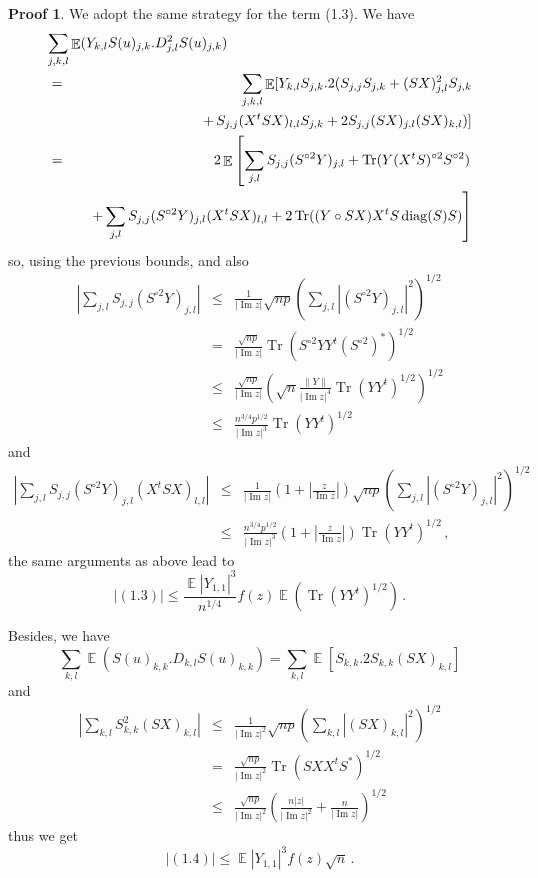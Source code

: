 \documentclass[11pt,a4paper]{article}
\DeclareMathOperator{\E}{\mathbb{E}}
\DeclareMathOperator{\1}{\mathbf{1}}
\DeclareMathOperator{\Imag}{\mathrm{Im}}
\DeclareMathOperator{\Tr}{\mathrm{Tr}}
\DeclareMathOperator{\diag}{\mathrm{diag}}
\theoremstyle{definition}
\newtheorem*{Proof}{Proof}
\begin{document}
\begin{Proof}
We adopt the same strategy for the term (1.3). We have
\begin{eqnarray*}
\lefteqn{   \sum_{j,k,l} \E (Y_{k,l}S(u)_{j,k}.D^2_{j,l}S(u)_{j,k})   } \\
& = & \sum_{j,k,l} \E[ Y_{k,l} S_{j,k} . 2(S_{j,j} S_{j,k} + (SX)_{j,l}^2 S_{j,k}  \\
& & \quad + \, S_{j,j} (X^tSX)_{l,l} S_{j,k} + 2 S_{j,j} (SX)_{j,l} (SX)_{k,l}) ] \\
& = & 2 \E \left[ \sum_{j,l} S_{j,j} (S^{\circ 2}Y)_{j,l} + \Tr( Y(X^tS)^{\circ 2}S^{\circ 2} ) \right. \\
& & \quad \left. + \sum_{j,l} S_{j,j} (S^{\circ 2}Y)_{j,l} (X^tSX)_{l,l} + 2 \Tr( (Y \circ SX)X^tS\diag(S)S ) \right]
\end{eqnarray*}
so, using the previous bounds, and also
\begin{eqnarray*}
\left| \sum_{j,l} S_{j,j} (S^{\circ 2}Y)_{j,l} \right|
& \le & \frac{1}{|\Imag z|} \sqrt{np} \left( \sum_{j,l} |(S^{\circ 2}Y)_{j,l}|^2 \right)^{1/2} \\
& = & \frac{\sqrt{np}}{|\Imag z|} \Tr( S^{\circ 2}YY^t(S^{\circ 2})^* )^{1/2} \\
& \le & \frac{\sqrt{np}}{|\Imag z|} \left( \sqrt{n} \frac{\|Y\|}{|\Imag z|^4} \Tr(YY^t)^{1/2} \right)^{1/2} \\
& \le & \frac{n^{3/4} p^{1/2}}{|\Imag z|^3} \Tr(YY^t)^{1/2}
\end{eqnarray*}
and
\begin{eqnarray*}
\left| \sum_{j,l} S_{j,j} (S^{\circ 2}Y)_{j,l} (X^tSX)_{l,l} \right|
& \le & \frac{1}{|\Imag z|} \left( 1 + \left| \frac{z}{\Imag z} \right| \right) \sqrt{np} \left( \sum_{j,l} |(S^{\circ 2}Y)_{j,l}|^2 \right)^{1/2} \\
& \le & \frac{n^{3/4} p^{1/2}}{|\Imag z|^3} \left( 1 + \left| \frac{z}{\Imag z} \right| \right) \Tr(YY^t)^{1/2} \, ,
\end{eqnarray*}
the same arguments as above lead to
\begin{displaymath}
|(1.3)| \le \frac{\E|Y_{1,1}|^3}{n^{1/4}} f(z) \E (\Tr(YY^t)^{1/2}) \, .
\end{displaymath}

Besides, we have
\begin{displaymath}
\sum_{k,l} \E (S(u)_{k,k}.D_{k,l}S(u)_{k,k}) = \sum_{k,l} \E[ S_{k,k} . 2 S_{k,k} (SX)_{k,l}]
\end{displaymath}
and
\begin{eqnarray*}
\left| \sum_{k,l} S_{k,k}^2 (SX)_{k,l} \right|
& \le & \frac{1}{|\Imag z|^2} \sqrt{np} \left( \sum_{k,l} |(SX)_{k,l}|^2 \right)^{1/2} \\
& = & \frac{\sqrt{np}}{|\Imag z|^2} \Tr(SXX^tS^*)^{1/2} \\
& \le & \frac{\sqrt{np}}{|\Imag z|^2} \left( \frac{n|z|}{|\Imag z|^2} + \frac{n}{|\Imag z|} \right)^{1/2}
\end{eqnarray*}
thus we get
\begin{displaymath}
|(1.4)| \le \E|Y_{1,1}|^3 f(z) \sqrt{n} \, .
\end{displaymath}


\end{Proof}
\end{document}
